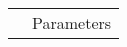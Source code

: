 \begin{table*}[h] \footnotesize
\centering
\begin{tabular}{|l | l|}
\hline
& Parameters \\

\end{tabular}
\end{table*}
